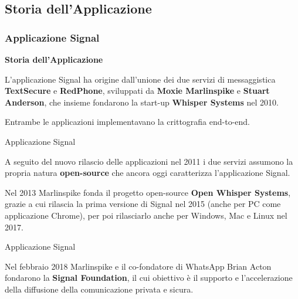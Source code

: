 \subsection{Storia dell'Applicazione}

\begin{frame}
    \frametitle{Applicazione Signal}
    \textbf{Storia dell'Applicazione}
    \newline
    
    L’applicazione Signal ha origine dall’unione dei due servizi di messaggistica \textbf{TextSecure} e \textbf{RedPhone}, sviluppati da \textbf{Moxie Marlinspike} e \textbf{Stuart Anderson}, che insieme fondarono la start-up \textbf{Whisper Systems} nel 2010.\newline \pause

    Entrambe le applicazioni implementavano la crittografia end-to-end.

\end{frame}

\begin{frame}{Applicazione Signal}

    A seguito del nuovo rilascio delle applicazioni nel 2011 i due servizi assumono la propria natura \textbf{open-source} che ancora oggi caratterizza l’applicazione Signal.\newline \pause
    
    Nel 2013 Marlinspike fonda il progetto open-source \textbf{Open Whisper Systems}, grazie a cui rilascia la prima versione di Signal nel 2015 (anche per PC come applicazione Chrome), per poi rilasciarlo anche per Windows, Mac e Linux nel 2017. \newline
    
\end{frame}

\begin{frame}{Applicazione Signal}

  Nel febbraio 2018 Marlinspike e il co-fondatore di WhatsApp Brian Acton fondarono la \textbf{Signal Foundation}, il cui obiettivo è il supporto e l’accelerazione della diffusione della comunicazione privata e sicura.
    
\end{frame}